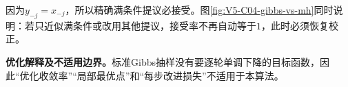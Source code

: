 \documentclass[UTF8,a4paper,11pt,openany]{ctexbook}
\begin{document}
\setcounter{page}{805}
\setcounter{chapter}{33}
\setcounter{figure}{4}
\pagestyle{headings}
因为$y_{-j}=x_{-j}$，所以精确满条件提议必接受。图\ref{fig:V5-C04-gibbs-vs-mh}同时说明：若只近似满条件或改用其他提议，接受率不再自动等于$1$，此时必须恢复\MetropolisHastings{}校正。

\FloatBarrier
\textbf{优化解释及不适用边界。}标准Gibbs抽样没有要逐轮单调下降的目标函数，因此“优化收敛率”“局部最优点”和“每步改进损失”不适用于本算法。
\end{document}
